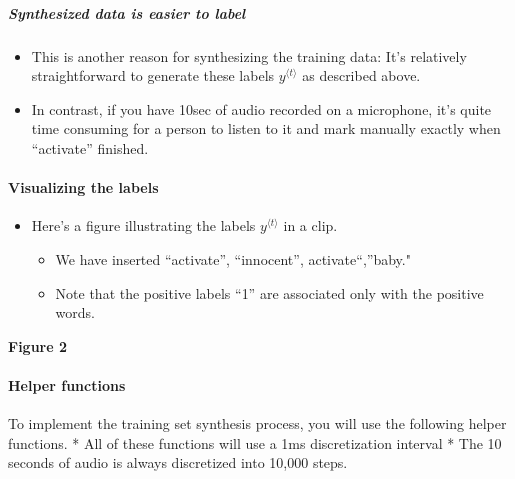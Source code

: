 \documentclass[11pt]{article}
\begin{document}
\subparagraph{Synthesized data is easier to
label}\label{synthesized-data-is-easier-to-label}

\begin{itemize}
\itemsep1pt\parskip0pt
\item
  This is another reason for synthesizing the training data: It's
  relatively straightforward to generate these labels
  $y^{\langle t \rangle}$ as described above.
\item
  In contrast, if you have 10sec of audio recorded on a microphone, it's
  quite time consuming for a person to listen to it and mark manually
  exactly when ``activate'' finished.
\end{itemize}

    \paragraph{Visualizing the labels}\label{visualizing-the-labels}

\begin{itemize}
\itemsep1pt\parskip0pt
\item
  Here's a figure illustrating the labels $y^{\langle t \rangle}$ in a
  clip.

  \begin{itemize}
  \itemsep1pt\parskip0pt
  \item
    We have inserted ``activate'', ``innocent'', activate``,''baby."
  \item
    Note that the positive labels ``1'' are associated only with the
    positive words.
  \end{itemize}
\end{itemize}

\textbf{Figure 2}

    \paragraph{Helper functions}\label{helper-functions}

To implement the training set synthesis process, you will use the
following helper functions. * All of these functions will use a 1ms
discretization interval * The 10 seconds of audio is always discretized
into 10,000 steps.
\end{document}

